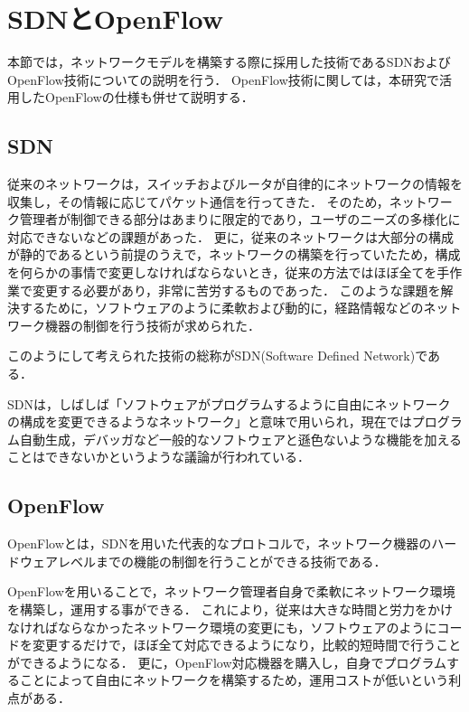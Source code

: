 \section{SDNとOpenFlow}

本節では，ネットワークモデルを構築する際に採用した技術であるSDNおよびOpenFlow技術についての説明を行う．
OpenFlow技術に関しては，本研究で活用したOpenFlowの仕様も併せて説明する．

\subsection{SDN}

従来のネットワークは，スイッチおよびルータが自律的にネットワークの情報を収集し，その情報に応じてパケット通信を行ってきた\cite{openflownet}．
そのため，ネットワーク管理者が制御できる部分はあまりに限定的であり，ユーザのニーズの多様化に対応できないなどの課題があった．
更に，従来のネットワークは大部分の構成が静的であるという前提のうえで，ネットワークの構築を行っていたため，構成を何らかの事情で変更しなければならないとき，従来の方法ではほぼ全てを手作業で変更する必要があり，非常に苦労するものであった．
このような課題を解決するために，ソフトウェアのように柔軟および動的に，経路情報などのネットワーク機器の制御を行う技術が求められた．

このようにして考えられた技術の総称がSDN(Software Defined Network)である．

SDNは，しばしば「ソフトウェアがプログラムするように自由にネットワークの構成を変更できるようなネットワーク」と意味で用いられ\cite{openflowjapanese}，現在ではプログラム自動生成，デバッガなど一般的なソフトウェアと遜色ないような機能を加えることはできないかというような議論が行われている．

\subsection{OpenFlow}

OpenFlowとは，SDNを用いた代表的なプロトコルで，ネットワーク機器のハードウェアレベルまでの機能の制御を行うことができる技術である\cite{openflowjapanese}．

OpenFlowを用いることで，ネットワーク管理者自身で柔軟にネットワーク環境を構築し，運用する事ができる．
これにより，従来は大きな時間と労力をかけなければならなかったネットワーク環境の変更にも，ソフトウェアのようにコードを変更するだけで，ほぼ全て対応できるようになり，比較的短時間で行うことができるようになる．
更に，OpenFlow対応機器を購入し，自身でプログラムすることによって自由にネットワークを構築するため，運用コストが低いという利点がある．

